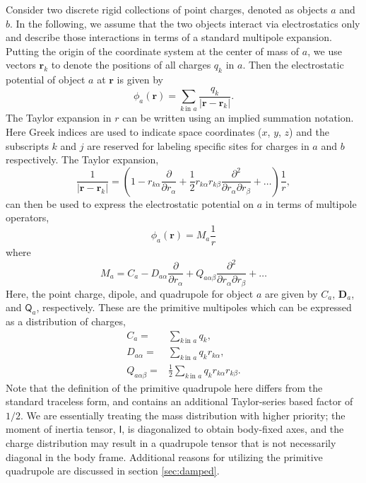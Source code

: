 Consider two discrete rigid collections of point charges, denoted as objects
$a$ and $b$.  In the following, we assume that the two objects
interact via electrostatics only and describe those interactions in
terms of a standard multipole expansion.  Putting the origin of the
coordinate system at the center of mass of $a$, we use vectors
$\mathbf{r}_k$ to denote the positions of all charges $q_k$ in 
$a$.  Then the electrostatic potential of object $a$ at
$\mathbf{r}$ is given by
\begin{equation}
\phi_a(\mathbf r) = 
 \sum_{k \, \text{in } a} \frac{q_k}{\lvert \mathbf{r} - \mathbf{r}_k \rvert}.
\end{equation}
The Taylor expansion in $r$ can be written using an implied summation
notation.  Here Greek indices are used to indicate space coordinates
($x$, $y$, $z$) and the subscripts $k$ and $j$ are reserved for
labeling specific sites for charges in $a$ and $b$ respectively.  The
Taylor expansion,
\begin{equation}
 \frac{1}{\lvert \mathbf{r} - \mathbf{r}_k \rvert} = 
\left( 1
-  r_{k\alpha} \frac{\partial}{\partial r_{\alpha}} 
+ \frac{1}{2}  r_{k\alpha} r_{k\beta} \frac{\partial^2}{\partial r_{\alpha} \partial r_{\beta}} +\dots 
\right)
\frac{1}{r}  ,
\end{equation}
can then be used to express the electrostatic potential on $a$ in
terms of multipole operators,
\begin{equation}
\phi_a(\mathbf{r}) =M_a \frac{1}{r} 
\end{equation}
where
\begin{equation}
M_a = C_a - D_{a\alpha} \frac{\partial}{\partial r_{\alpha}} 
+  Q_{a\alpha\beta}
 \frac{\partial^2}{\partial r_{\alpha} \partial r_{\beta}} + \dots
\end{equation}
Here, the point charge, dipole, and quadrupole for object $a$ are
given by $C_a$, $\mathbf{D}_a$, and $\mathsf{Q}_a$, respectively.  These are the primitive multipoles
which can be expressed as a distribution of charges,
\begin{align}
C_a =&\sum_{k \, \text{in }a} q_k , \label{eq:charge} \\
D_{a\alpha} =&\sum_{k \, \text{in }a} q_k r_{k\alpha}, \label{eq:dipole}\\
Q_{a\alpha\beta} =& \frac{1}{2} \sum_{k \, \text{in }  a} q_k
r_{k\alpha}  r_{k\beta} . \label{eq:quadrupole}
\end{align}
Note that the definition of the primitive quadrupole here differs from
the standard traceless form, and contains an additional Taylor-series
based factor of $1/2$.  We are essentially treating the mass
distribution with higher priority; the moment of inertia tensor,
$\mathsf I$, is diagonalized to obtain body-fixed
axes, and the charge distribution may result in a quadrupole tensor
that is not necessarily diagonal in the body frame.  Additional
reasons for utilizing the primitive quadrupole are discussed in
section \ref{sec:damped}.


